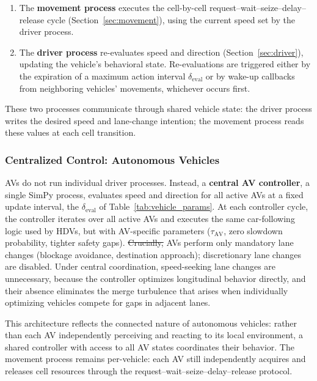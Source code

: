 \documentclass[review,number]{elsarticle} %
\providecommand{\DIFdeltex}[1]{{\protect\color{red}\sout{#1}}}                      %
\providecommand{\DIFdelbegin}{} %
\providecommand{\DIFdelend}{} %
\providecommand{\DIFdel}[1]{\texorpdfstring{\DIFdeltex{#1}}{}} %
\newcommand{\DIFscaledelfig}{0.5}
\newlength{\DIFdelgraphicswidth} %
\newlength{\DIFdelgraphicsheight} %
\newcommand{\DIFdelincludegraphics}[2][]{%
\sbox{\DIFdelgraphicsbox}{\DIFOincludegraphics[#1]{#2}}%
\settoboxwidth{\DIFdelgraphicswidth}{\DIFdelgraphicsbox} %
\settoboxtotalheight{\DIFdelgraphicsheight}{\DIFdelgraphicsbox} %
\scalebox{\DIFscaledelfig}{%
\parbox[b]{\DIFdelgraphicswidth}{\usebox{\DIFdelgraphicsbox}\\[-\baselineskip] \rule{\DIFdelgraphicswidth}{0em}}\llap{\resizebox{\DIFdelgraphicswidth}{\DIFdelgraphicsheight}{%
\setlength{\unitlength}{\DIFdelgraphicswidth}%
\begin{picture}(1,1)%
\thicklines\linethickness{2pt} %
{\color[rgb]{1,0,0}\put(0,0){\framebox(1,1){}}}%
{\color[rgb]{1,0,0}\put(0,0){\line( 1,1){1}}}%
{\color[rgb]{1,0,0}\put(0,1){\line(1,-1){1}}}%
\end{picture}%
}\hspace*{3pt}}} %
} %
\DeclareRobustCommand{\DIFdelbegin}{\DIFOdelbegin \let\includegraphics\DIFdelincludegraphics} %
\DeclareRobustCommand{\DIFdelend}{\DIFOaddend \let\includegraphics\DIFOincludegraphics} %
\begin{document}
\begin{enumerate}
    \item The \textbf{movement process} executes the cell-by-cell request--wait--seize--delay--release cycle (Section~\ref{sec:movement}), using the current speed set by the driver process.

    \item The \textbf{driver process} re-evaluates speed and direction (Section~\ref{sec:driver}), updating the vehicle's behavioral state. Re-evaluations are triggered either by the expiration of a maximum action interval $\delta_{\text{eval}}$ or by wake-up callbacks from neighboring vehicles' movements, whichever occurs first.
\end{enumerate}

These two processes communicate through shared vehicle state: the driver process writes the desired speed and lane-change intention; the movement process reads these values at each cell transition.

\subsubsection{Centralized Control: Autonomous Vehicles}
\label{sec:av_controller}

AVs do not run individual driver processes. Instead, a \textbf{central AV controller}, a single SimPy process, evaluates speed and direction for all active AVs at a fixed update interval, the $\delta_{\text{eval}}$ of Table~\ref{tab:vehicle_params}. At each controller cycle, the controller iterates over all active AVs and executes the same car-following logic used by HDVs, but with AV-specific parameters ($\tau_{\text{AV}}$, zero slowdown probability, tighter safety gaps). \DIFdelbegin \DIFdel{Crucially, }\DIFdelend AVs perform only mandatory lane changes (blockage avoidance, destination approach); discretionary lane changes are disabled. Under central coordination, speed-seeking lane changes are unnecessary, because the controller optimizes longitudinal behavior directly, and their absence eliminates the merge turbulence that arises when individually optimizing vehicles compete for gaps in adjacent lanes.

This architecture reflects the connected nature of autonomous vehicles: rather than each AV independently perceiving and reacting to its local environment, a shared controller with access to all AV states coordinates their behavior. The movement process remains per-vehicle: each AV still independently acquires and releases cell resources through the request--wait--seize--delay--release protocol.
\end{document}
